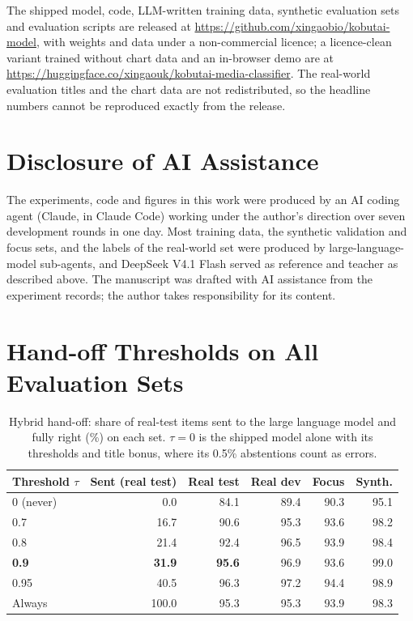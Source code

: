 \documentclass[11pt]{article}
\begin{document}
The shipped model, code, LLM-written training data, synthetic evaluation sets and evaluation scripts are released at \url{https://github.com/xingaobio/kobutai-model}, with weights and data under a non-commercial licence; a licence-clean variant trained without chart data and an in-browser demo are at \url{https://huggingface.co/xingaouk/kobutai-media-classifier}. The real-world evaluation titles and the chart data are not redistributed, so the headline numbers cannot be reproduced exactly from the release.

\section*{Disclosure of AI Assistance}

The experiments, code and figures in this work were produced by an AI coding agent (Claude, in Claude Code) working under the author's direction over seven development rounds in one day. Most training data, the synthetic validation and focus sets, and the labels of the real-world set were produced by large-language-model sub-agents, and DeepSeek V4.1 Flash served as reference and teacher as described above. The manuscript was drafted with AI assistance from the experiment records; the author takes responsibility for its content.




\appendix
\section{Hand-off Thresholds on All Evaluation Sets}
\label{app:hybrid}

\begin{table}[h]
  \centering
  \small
  \caption{Hybrid hand-off: share of real-test items sent to the large language model and fully right (\%) on each set. $\tau = 0$ is the shipped model alone with its thresholds and title bonus, where its 0.5\% abstentions count as errors.}
  \label{tab:hybrid}
  \begin{tabular}{@{}lrrrrr@{}}
    \toprule
    Threshold $\tau$ & Sent (real test) & Real test & Real dev & Focus & Synth. \\
    \midrule
    0 (never) & 0.0 & 84.1 & 89.4 & 90.3 & 95.1 \\
    0.7 & 16.7 & 90.6 & 95.3 & 93.6 & 98.2 \\
    0.8 & 21.4 & 92.4 & 96.5 & 93.9 & 98.4 \\
    \textbf{0.9} & \textbf{31.9} & \textbf{95.6} & 96.9 & 93.6 & 99.0 \\
    0.95 & 40.5 & 96.3 & 97.2 & 94.4 & 98.9 \\
    Always & 100.0 & 95.3 & 95.3 & 93.9 & 98.3 \\
    \bottomrule
  \end{tabular}
\end{table}
\end{document}
